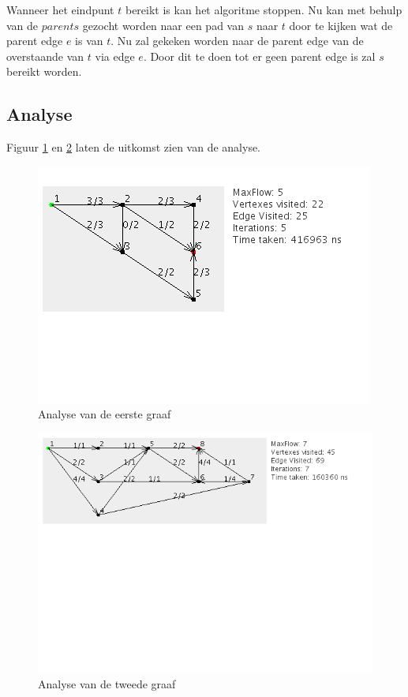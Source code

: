 Wanneer het eindpunt $t$ bereikt is kan het algoritme stoppen. Nu kan met behulp van de $parents$ gezocht worden naar een pad van $s$ naar $t$ door te kijken wat de parent edge $e$ is van $t$. Nu zal gekeken worden naar de parent edge van de overstaande van $t$ via edge $e$. Door dit te doen tot er geen parent edge is zal $s$ bereikt worden.

\subsection{Analyse}

Figuur \ref{fig:DFS_graph1} en \ref{fig:DFS_graph2} laten de uitkomst zien van de analyse.

\begin{figure}[h]
	\includegraphics[width=0.5\linewidth]{depthfirst/DFS_graph1}
	\centering
	\caption{Analyse van de eerste graaf}
	\label{fig:DFS_graph1}
\end{figure}

\begin{figure}[h]
	\includegraphics[width=0.5\linewidth]{depthfirst/DFS_graph2}
	\centering
	\caption{Analyse van de tweede graaf}
	\label{fig:DFS_graph2}
\end{figure}